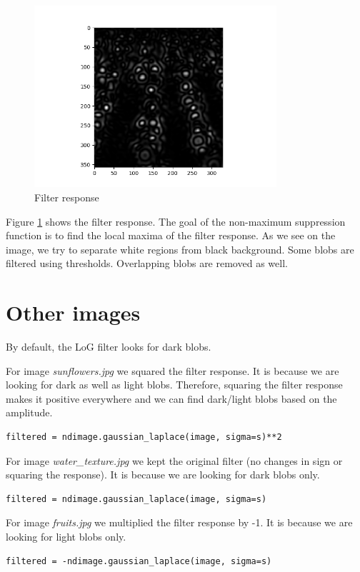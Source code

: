 \documentclass{article}
\begin{document}
\begin{figure}[H]
\centering
\includegraphics[width=0.8\textwidth]{figs/filter_response.png}
\caption{Filter response}
\label{fig:filter_resp}
\end{figure}
Figure \ref{fig:filter_resp} shows the filter response. The goal of the non-maximum suppression function is to find the local maxima of the filter response. As we see on the image, we try to separate white regions from black background. Some blobs are filtered using thresholds. Overlapping blobs are removed as well.


\section{Other images}
By default, the LoG filter looks for dark blobs.
\vspace*{0.3cm}

For image \textit{sunflowers.jpg} we squared the filter response. It is because we are looking for dark as well as light blobs. Therefore, squaring the filter response makes it positive everywhere and we can find dark/light blobs based on the amplitude.
\begin{verbatim}
filtered = ndimage.gaussian_laplace(image, sigma=s)**2
\end{verbatim}

\vspace*{0.4cm}
For image \textit{water\_texture.jpg} we kept the original filter (no changes in sign or squaring the response). It is because we are looking for dark blobs only. 
\begin{verbatim}
filtered = ndimage.gaussian_laplace(image, sigma=s)
\end{verbatim}

\vspace*{0.4cm}
For image \textit{fruits.jpg} we multiplied the filter response by -1. It is because we are looking for light blobs only.
\begin{verbatim}
filtered = -ndimage.gaussian_laplace(image, sigma=s)
\end{verbatim}     
\end{document}
